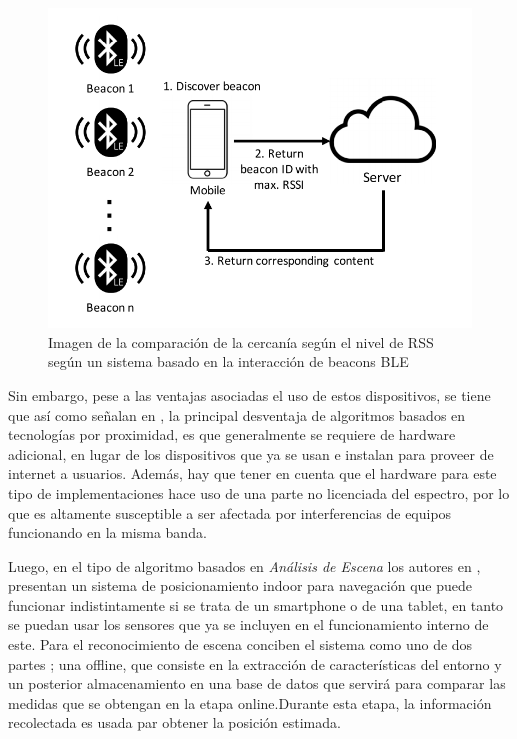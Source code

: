 \begin{figure}[h!]
    \centering
    \includegraphics[scale=0.3]{./images/beacon}
    \caption{Imagen de la comparación de la cercanía según el nivel de RSS según un sistema basado en la interacción de beacons BLE}
    \label{fig:my_label}
\end{figure}

Sin embargo, pese a las ventajas asociadas el uso de estos dispositivos, se tiene que así como señalan en \cite{1}, la principal desventaja de algoritmos basados en tecnologías por proximidad, es que generalmente se requiere de hardware adicional, en lugar de los dispositivos que ya se usan e instalan para proveer de internet a usuarios. Además, hay que tener en cuenta que el hardware para este tipo de implementaciones hace uso de una parte no licenciada del espectro, por lo que es altamente susceptible a ser afectada por interferencias de equipos funcionando en la misma banda.

Luego, en el tipo de algoritmo basados en \textit{Análisis de Escena} los autores en \cite{1}, presentan un sistema de posicionamiento indoor para navegación que puede funcionar indistintamente si se trata de un smartphone o de una tablet, en tanto se puedan usar los sensores que ya se incluyen en el funcionamiento interno de este. Para el reconocimiento de escena conciben el sistema como uno de dos partes \cite{8}; una offline, que consiste en la extracción de características del entorno y un posterior almacenamiento en una base de datos que servirá para comparar las medidas que se obtengan en la etapa online.Durante esta etapa, la información recolectada es usada par obtener la posición estimada.

